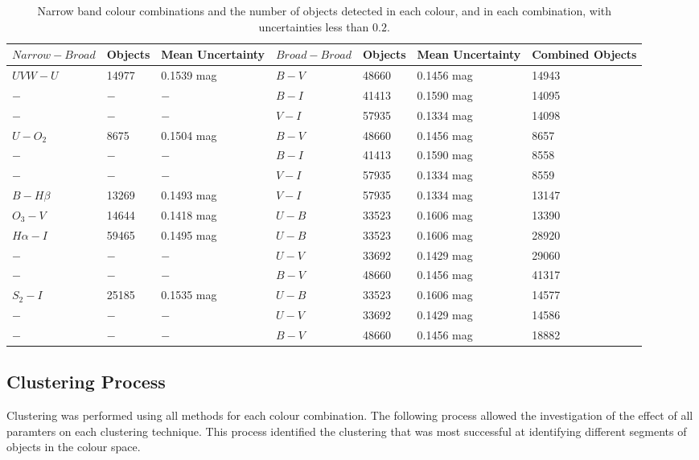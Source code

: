 \begin{table}
\centering
\caption{Narrow band colour combinations and the number of objects detected in each colour, and in each combination, with uncertainties less than $0.2$.}
\label{tab:NBcolourcombos}
\begin{tabular}{lllllll}
\hline\hline
$Narrow - Broad$ & Objects & Mean Uncertainty & $Broad - Broad$ & Objects & Mean Uncertainty & Combined Objects \\
\hline
$UVW - U$ &  14977 & 0.1539 mag & $B - V$ &  48660 & 0.1456 mag & 14943 \\
$ - $ & $ - $ & $ - $ & $B - I$ &  41413 & 0.1590 mag & 14095 \\
$ - $ & $ - $ & $ - $ & $V - I$ &  57935 & 0.1334 mag & 14098 \\
\hline
$U - O_{2}$ & 8675 & 0.1504 mag & $B - V$ &  48660 & 0.1456 mag & 8657 \\
$ - $ & $ - $ & $ - $ & $B - I$ &  41413 & 0.1590 mag & 8558 \\
$ - $ & $ - $ & $ - $ & $V - I$ &  57935 & 0.1334 mag & 8559 \\
\hline
$B - H\beta$ & 13269 & 0.1493 mag & $V - I$ &  57935 & 0.1334 mag & 13147 \\
\hline
$O_{3} - V$ & 14644 & 0.1418 mag & $U - B$ &  33523 & 0.1606 mag & 13390 \\
\hline
$H\alpha - I$ & 59465 & 0.1495 mag & $U - B$ &  33523 & 0.1606 mag & 28920 \\
$ - $ & $ - $ & $ - $ & $U - V$ &  33692 & 0.1429 mag & 29060 \\
$ - $ & $ - $ & $ - $ & $B - V$ &  48660 & 0.1456 mag & 41317 \\
\hline
$S_{2} - I$ & 25185 & 0.1535 mag & $U - B$ &  33523 & 0.1606 mag & 14577 \\
$ - $ & $ - $ & $ - $ & $U - V$ &  33692 & 0.1429 mag & 14586 \\
$ - $ & $ - $ & $ - $ & $B - V$ &  48660 & 0.1456 mag & 18882 \\
\hline
\end{tabular}
\end{table}

\subsection{Clustering Process}
Clustering was performed using all methods for each colour combination. 
The following process allowed the investigation of the effect of all paramters on each clustering technique.
This process identified the clustering that was most successful at identifying different segments of objects in the colour space.

